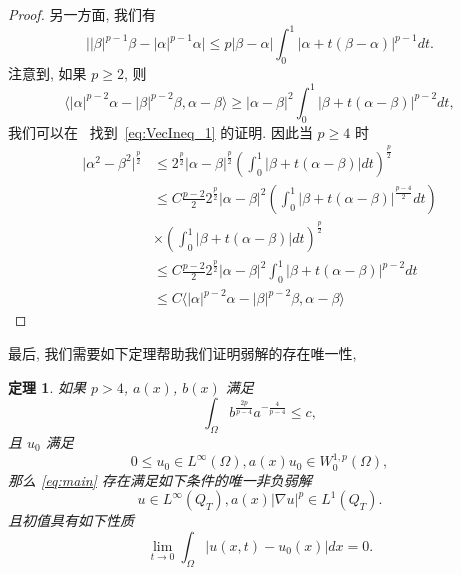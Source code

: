 \documentclass[oneside,longtitle]{LZUthesis}
\newtheorem{theorem}{定理}[chapter]
\theoremstyle{definition}
\numberwithin{equation}{chapter}
\newcommand*\abs[1]{\lvert#1\rvert}
\begin{document}
\begin{proof}
	另一方面, 我们有
	\begin{equation}
		\abs{\abs{\beta}^{p-1}\beta - \abs{\alpha}^{p-1}\alpha} \leq p\abs{\beta-\alpha}\int_0^1 \abs{\alpha + t(\beta - \alpha)}^{p-1}dt.
	\end{equation}
	注意到, 如果 $p \geq 2$, 则
	\begin{equation}\label{eq:VecIneq_1}
		\langle \abs{\alpha}^{p-2}\alpha - \abs{\beta}^{p-2}\beta, \alpha-\beta\rangle
		\geq \abs{\alpha-\beta}^2\int_0^1 \abs{\beta + t(\alpha - \beta)}^{p-2}dt,
	\end{equation}
	我们可以在~\cite{lindqvistNotesStationaryPLaplace2019} 找到~\cref{eq:VecIneq_1} 的证明.
	因此当 $p \geq 4$ 时
	\begin{equation}
		\begin{split}
			\abs{\alpha^2 - \beta^2}^{\frac{p}{2}}
			&\leq 2^{\frac{p}{2}}\abs{\alpha-\beta}^{\frac{p}{2}}
			\left(\int_0^1 \abs{\beta + t(\alpha - \beta)}dt\right)^{\frac{p}{2}}\\
			&\leq C\frac{p-2}{2}2^{\frac{p}{2}}\abs{\alpha-\beta}^2
			\left(\int_0^1 \abs{\beta + t(\alpha - \beta)}^{\frac{p-4}{2}}dt\right)\\
			&\times\left(\int_0^1 \abs{\beta + t(\alpha - \beta)}dt\right)^{\frac{p}{2}}\\
			&\leq C\frac{p-2}{2}2^{\frac{p}{2}}\abs{\alpha-\beta}^2
			\int_0^1 \abs{\beta + t(\alpha - \beta)}^{p-2}dt\\
			&\leq C \langle \abs{\alpha}^{p-2}\alpha - \abs{\beta}^{p-2}\beta, \alpha-\beta\rangle
		\end{split}
	\end{equation}
\end{proof}

最后, 我们需要如下定理帮助我们证明弱解的存在唯一性,
\begin{theorem}\cite[定理 1.3 和 1.6]{Zhan2019Uniquenessa}\label{thm:zhan}
	如果 $p>4$, $a(x)$, $b(x)$ 满足
	\begin{equation}\label{eq:zhan_intcondition}
		\int_{\Omega} b^{\frac{2p}{p-4}}a^{-\frac{4}{p-4}} \leq c,
	\end{equation}
	且 $u_0$ 满足
	\begin{equation}\label{eq:zhan_initdata}
		0 \leq u_0 \in L^{\infty}(\Omega), a(x)u_0 \in W_0^{1,p}(\Omega),
	\end{equation}
	那么 \cref{eq:main} 存在满足如下条件的唯一非负弱解
	\begin{equation}
		u \in L^{\infty}(Q_T), a(x)\abs{\nabla u}^p \in L^1(Q_T).
	\end{equation}
	且初值具有如下性质
	\begin{equation}
		\lim_{t \to 0}\int_{\Omega}\abs{u(x,t) - u_0(x)}dx = 0.
	\end{equation}
\end{theorem}
\end{document}
